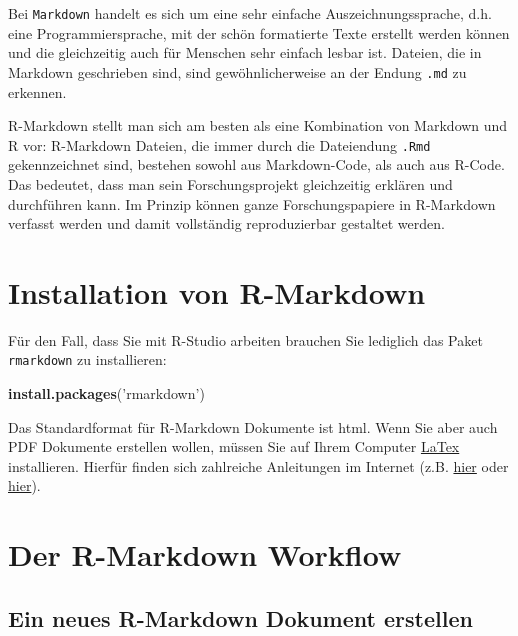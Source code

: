 \documentclass[]{book}
\newenvironment{Shaded}{\begin{snugshade}}{\end{snugshade}}
\newcommand{\KeywordTok}[1]{\textcolor[rgb]{0.13,0.29,0.53}{\textbf{#1}}}
\newcommand{\StringTok}[1]{\textcolor[rgb]{0.31,0.60,0.02}{#1}}
\newcommand{\NormalTok}[1]{#1}
\begin{document}
Bei \texttt{Markdown} handelt es sich um eine sehr einfache
Auszeichnungssprache, d.h. eine Programmiersprache, mit der schön
formatierte Texte erstellt werden können und die gleichzeitig auch für
Menschen sehr einfach lesbar ist. Dateien, die in Markdown geschrieben
sind, sind gewöhnlicherweise an der Endung \texttt{.md} zu erkennen.

R-Markdown stellt man sich am besten als eine Kombination von Markdown
und R vor: R-Markdown Dateien, die immer durch die Dateiendung
\texttt{.Rmd} gekennzeichnet sind, bestehen sowohl aus Markdown-Code,
als auch aus R-Code. Das bedeutet, dass man sein Forschungsprojekt
gleichzeitig erklären und durchführen kann. Im Prinzip können ganze
Forschungspapiere in R-Markdown verfasst werden und damit vollständig
reproduzierbar gestaltet werden.

\section{Installation von R-Markdown}\label{installation-von-r-markdown}

Für den Fall, dass Sie mit R-Studio arbeiten brauchen Sie lediglich das
Paket \texttt{rmarkdown} zu installieren:

\begin{Shaded}
\begin{Highlighting}[]
\KeywordTok{install.packages}\NormalTok{(}\StringTok{'rmarkdown'}\NormalTok{)}
\end{Highlighting}
\end{Shaded}

Das Standardformat für R-Markdown Dokumente ist html. Wenn Sie aber auch
PDF Dokumente erstellen wollen, müssen Sie auf Ihrem Computer
\href{https://www.latex-project.org/}{LaTex} installieren. Hierfür
finden sich zahlreiche Anleitungen im Internet (z.B.
\href{https://www.latex-tutorial.com/installation/}{hier} oder
\href{https://www.latex-project.org/get/}{hier}).

\section{Der R-Markdown Workflow}\label{der-r-markdown-workflow}

\subsection{Ein neues R-Markdown Dokument
erstellen}\label{ein-neues-r-markdown-dokument-erstellen}
\end{document}
